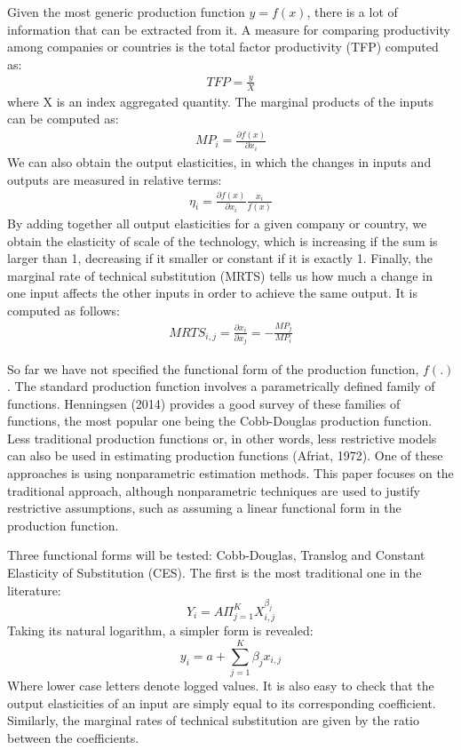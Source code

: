 \documentclass[12pt,a4paper]{article}\usepackage[]{graphicx}\usepackage[]{color}
\begin{document}
Given the most generic production function $y = f(x)$, there is a lot of information that can be extracted from it. A measure for comparing productivity among companies or countries is the total factor productivity (TFP) computed as:
\begin{align*}
TFP = \frac{y}{X}
\end{align*}
where X is an index aggregated quantity. The marginal products of the inputs can be computed as:
\begin{align*}
MP_i = \frac{\partial f(x)}{\partial x_i}
\end{align*}
We can also obtain the output elasticities, in which the changes in inputs and outputs are measured in relative terms:
\begin{align*}
\eta_i =  \frac{\partial f(x)}{\partial x_i} \frac{x_i}{f(x)}
\end{align*}
By adding together all output elasticities for a given company or country, we obtain the elasticity of scale of the technology, which is increasing if the sum is larger than 1, decreasing if it smaller or constant if it is exactly 1.
Finally, the marginal rate of technical substitution (MRTS) tells us how much a change in one input affects the other inputs in order to achieve the same output. It is computed as follows:
\begin{align*}
MRTS_{i,j} =  \frac{\partial x_i}{\partial x_j} = - \frac{MP_j}{MP_i}
\end{align*}

So far we have not specified the functional form of the production function, $f(.)$. The standard production function involves a parametrically defined family of functions. Henningsen (2014) provides a good survey of these families of functions, the most popular one being the Cobb-Douglas production function. Less traditional production functions or, in other words, less restrictive models can also be used in estimating production functions (Afriat, 1972). One of these approaches is using nonparametric estimation methods. This paper focuses on the traditional approach, although nonparametric techniques are used to justify restrictive assumptions, such as assuming a linear functional form in the production function.

Three functional forms will be tested: Cobb-Douglas, Translog and Constant Elasticity of Substitution (CES). The first is the most traditional one in the literature: 
\[ Y_i = A \Pi_{j=1}^K X_{i, j}^{\beta_j} \]
Taking its natural logarithm, a simpler form is revealed:
\[ y_i = a + \sum_{j=1}^K \beta_j x_{i, j} \]
Where lower case letters denote logged values. It is also easy to check that the output elasticities of an input are simply equal to its corresponding coefficient. Similarly, the marginal rates of technical substitution are given by the ratio between the coefficients.
\end{document}
